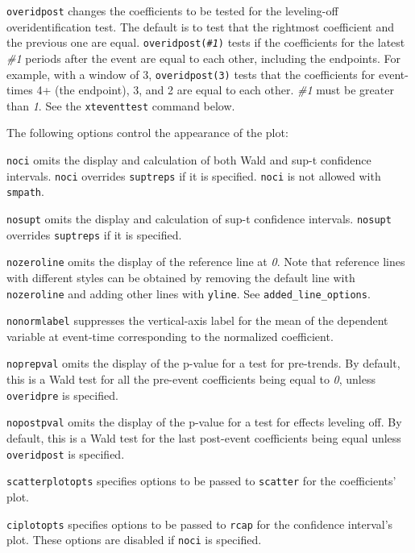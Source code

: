 \documentclass[12pt]{article}
\begin{document}
\hangpara
\texttt{overidpost} changes the coefficients to be tested for the leveling-off overidentification test.
The default is to test that the rightmost coefficient and the previous one are equal.
\texttt{overidpost({\it \#1})} tests if the coefficients for the latest {\it \#1} periods after the event are equal to each other, including the endpoints.
For example, with a window of 3, \texttt{overidpost(3)} tests that the coefficients for event-times 4+ (the endpoint), 3, and 2 are equal to each other.
{\it \#1} must be greater than {\it 1}.
See the \texttt{xteventtest} command below.

\hangpara
The following options control the appearance of the plot:

\hangpara
\texttt{noci} omits the display and calculation of both Wald and sup-t confidence intervals. \texttt{noci} overrides \texttt{suptreps} if it is specified.  \texttt{noci} is not allowed with \texttt{smpath}.

\hangpara
\texttt{nosupt} omits the display and calculation of sup-t confidence intervals. \texttt{nosupt} overrides \texttt{suptreps} if it is specified.

\hangpara
\texttt{nozeroline} omits the display of the reference line at {\it 0}. Note that reference lines with different styles can be obtained by removing the default line with \texttt{nozeroline} and adding other lines with \texttt{yline}. See \texttt{added\_line\_options}.

\hangpara
\texttt{nonormlabel} suppresses the vertical-axis label for the mean of the dependent variable at event-time corresponding to the normalized coefficient.

\hangpara
\texttt{noprepval} omits the display of the p-value for a test for pre-trends.
By default, this is a Wald test for all the pre-event coefficients being equal to {\it 0}, unless \texttt{overidpre} is specified.

\hangpara
\texttt{nopostpval} omits the display of the p-value for a test for effects leveling off.
By default, this is a Wald test for the last post-event coefficients being equal unless \texttt{overidpost} is specified.

\hangpara
\texttt{scatterplotopts} specifies options to be passed to \texttt{scatter} for the coefficients' plot.

\hangpara
\texttt{ciplotopts} specifies options to be passed to \texttt{rcap} for the confidence interval's plot.
These options are disabled if \texttt{noci} is specified.
\end{document}
